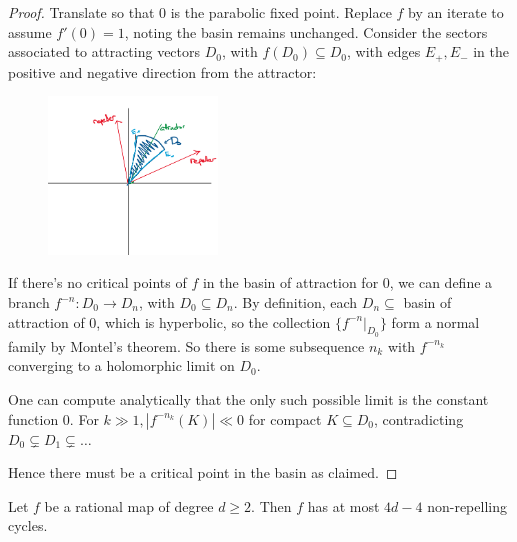 \documentclass[10pt,a4paper]{article}
\begin{document}
\begin{proof}
  Translate so that $0$ is the parabolic fixed point. Replace $f$ by an iterate to assume $f'(0) = 1$, noting the basin remains unchanged. Consider the sectors associated to attracting vectors $D_0$, with $f(D_0)\subseteq D_0$, with edges $E_+, E_-$ in the positive and negative direction from the attractor:
  \begin{figure}[H]
    \centering
    \vspace*{-13pt}
    \includegraphics[width=0.4\textwidth]{compdyn07.png}
  \end{figure}
  If there's no critical points of $f$ in the basin of attraction for  $0$, we can define a branch $f^{-n} : D_0 \to D_n$, with $D_0 \subseteq D_n$. By definition, each $D_n \subseteq$ basin of attraction of $0$, which is hyperbolic, so the collection $\{f^{-n}|_{D_0}\}$ form a normal family by Montel's theorem. So there is some subsequence $n_k$ with $f^{-n_k}$ converging to a holomorphic limit on $D_0$.

  One can compute analytically that the only such possible limit is the constant function 0. For $k \gg 1, |f^{-n_k}(K)|\ll 0$ for compact $K \subseteq D_0$, contradicting $D_0 \subsetneq D_1 \subsetneq \ldots$

  Hence there must be a critical point in the basin as claimed.
\end{proof}
\begin{corollary}
  Let $f$ be a rational map of degree $d \geq 2$. Then $f$ has at most $4d-4$ non-repelling cycles.
\end{corollary}
\end{document}
